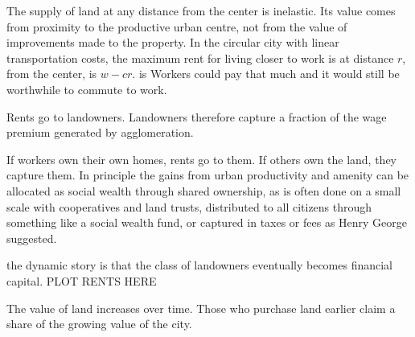 
The supply of land at any distance from the center is inelastic. 
Its value comes from proximity to the productive urban centre, not from the value of improvements made to the property. 
In the circular city with linear transportation costs, the maximum rent for living closer to work is at distance $r$, from the center, is $w-{c} r$.  is Workers could pay that much and it would still be worthwhile to commute to work. 

Rents go to landowners. %
Landowners therefore capture a fraction of the wage premium generated by agglomeration.

If workers own their own homes, rents go to them. If others own the land, they capture them. %
In principle the gains from urban productivity and amenity can be allocated as social wealth through shared ownership, as is often done on a small scale with cooperatives and land trusts, distributed to all citizens through something like a social wealth fund, or captured in taxes or fees as Henry George suggested. 

the dynamic story is that the class of landowners eventually becomes financial capital.
PLOT RENTS HERE

The value of land increases over time. Those who purchase land earlier claim a share of the growing value of the city. %
 
